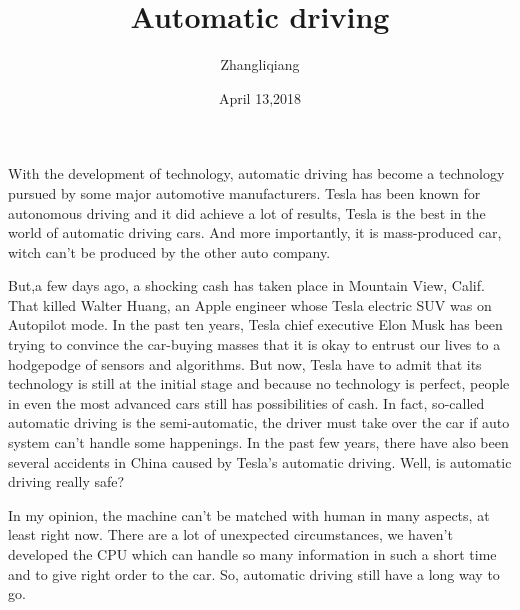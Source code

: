 \documentclass{article}
\author{Zhangliqiang}
\date{April 13,2018}
\title{Automatic driving}
\begin{document}
\maketitle

With the development of technology, automatic driving has become a technology pursued by some major automotive manufacturers. Tesla has been known for autonomous driving and it did achieve a lot of results, Tesla is the best in the world of automatic driving cars. And more importantly, it is mass-produced car, witch can't be produced by the other auto company.

But,a few days ago, a shocking cash has taken place in Mountain View, Calif. That killed Walter Huang, an Apple engineer whose Tesla electric SUV was on Autopilot mode. In the past ten years, Tesla chief executive Elon Musk has been trying to convince the car-buying masses that it is okay to entrust our lives to a hodgepodge of sensors and algorithms. But now, Tesla have to admit that its technology is still at the initial stage and because no technology is perfect, people in even the most advanced cars still has possibilities of cash. In fact, so-called automatic driving is the semi-automatic, the driver must take over the car if auto system can't handle some happenings. In the past few years, there have also been several accidents in China caused by Tesla's automatic driving. Well, is automatic driving really safe?

In my opinion, the machine can't be matched with human in many aspects, at least right now. There are a lot of unexpected circumstances, we haven't developed the CPU which can handle so many information in such a short time and to give right order to the car. So, automatic driving still have a long way to go.
\end{document}
